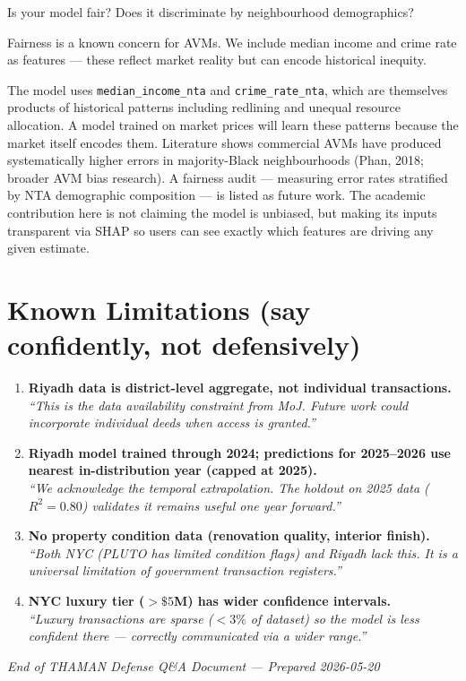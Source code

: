 \documentclass[11pt, a4paper, twoside]{article}
\begin{document}
\begin{question}{Is your model fair? Does it discriminate by neighbourhood demographics?}
\begin{shortanswer}
Fairness is a known concern for AVMs. We include median income and crime rate
as features --- these reflect market reality but can encode historical inequity.
\end{shortanswer}

\begin{detail}
The model uses \texttt{median\_income\_nta} and \texttt{crime\_rate\_nta},
which are themselves products of historical patterns including redlining and
unequal resource allocation. A model trained on market prices will learn these
patterns because the market itself encodes them. Literature shows commercial
AVMs have produced systematically higher errors in majority-Black neighbourhoods
(Phan, 2018; broader AVM bias research). A fairness audit --- measuring error
rates stratified by NTA demographic composition --- is listed as future work.
The academic contribution here is not claiming the model is unbiased, but making
its inputs transparent via SHAP so users can see exactly which features are
driving any given estimate.
\end{detail}
\end{question}

\section{Known Limitations (say confidently, not defensively)}
\label{sec:limits}

\begin{enumerate}
  \item \textbf{Riyadh data is district-level aggregate, not individual
        transactions.}\\
        \textit{``This is the data availability constraint from MoJ. Future work
        could incorporate individual deeds when access is granted.''}

  \item \textbf{Riyadh model trained through 2024; predictions for 2025--2026
        use nearest in-distribution year (capped at 2025).}\\
        \textit{``We acknowledge the temporal extrapolation. The holdout on 2025
        data ($R^2=0.80$) validates it remains useful one year forward.''}

  \item \textbf{No property condition data (renovation quality, interior finish).}\\
        \textit{``Both NYC (PLUTO has limited condition flags) and Riyadh lack
        this. It is a universal limitation of government transaction registers.''}

  \item \textbf{NYC luxury tier ($> \$5$M) has wider confidence intervals.}\\
        \textit{``Luxury transactions are sparse ($< 3\%$ of dataset) so the
        model is less confident there --- correctly communicated via a wider
        range.''}
\end{enumerate}

\vfill
\begin{center}
  {\small\textit{End of THAMAN Defense Q\&A Document --- Prepared 2026-05-20}}
\end{center}
\end{document}
